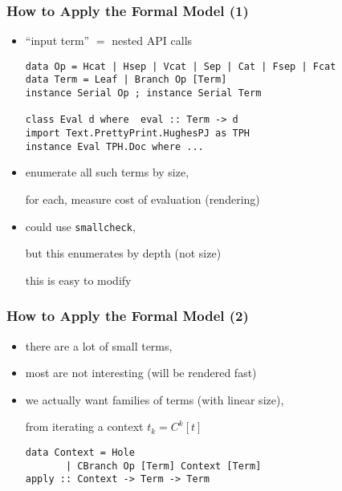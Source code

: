 \begin{frame}[fragile]
\frametitle{How to Apply the Formal Model (1)}

  \begin{itemize}[<+->]
  \item ``input term'' $=$ nested API calls

\begin{verbatim}
data Op = Hcat | Hsep | Vcat | Sep | Cat | Fsep | Fcat
data Term = Leaf | Branch Op [Term]
instance Serial Op ; instance Serial Term

class Eval d where  eval :: Term -> d 
import Text.PrettyPrint.HughesPJ as TPH 
instance Eval TPH.Doc where ...
\end{verbatim}

  \item enumerate all such terms by size,

    for each, measure cost of evaluation (rendering)

  \item could use \texttt{smallcheck}, 

    but this enumerates by depth (not size) 

    this is easy to modify

  \end{itemize}
\end{frame}

\begin{frame}[fragile]
\frametitle{How to Apply the Formal Model (2)}

  \begin{itemize}[<+->]
  \item there are a lot of small terms,
  \item most are not interesting (will be rendered fast)
  \item we actually want families of terms
    (with linear size), 

    from iterating a context $t_k=C^k[t]$
\begin{verbatim}
data Context = Hole
       | CBranch Op [Term] Context [Term]
apply :: Context -> Term -> Term
\end{verbatim}

  \end{itemize}

\end{frame}
